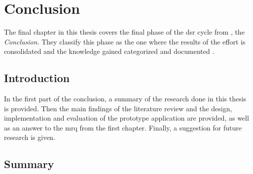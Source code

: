 
\chapter{Conclusion}

\label{ChapterConclusion}

The final chapter in this thesis covers the final phase of the \gls{dsr} cycle from \cite{Vaishnavi2008}, the \textit{Conclusion}. They classify this phase as the one where the results of the effort is consolidated and the knowledge gained categorized and documented \citep{Vaishnavi2008}.



\section{Introduction}

In the first part of the conclusion, a summary of the research done in this thesis is provided. Then the main findings of the literature review and the design, implementation and evaluation of the prototype application are provided, as well as an answer to the \gls{mrq} from the first chapter. Finally, a suggestion for future research is given.



\section{Summary}

